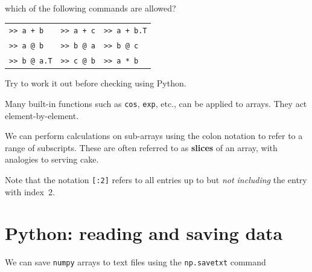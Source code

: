 




\noindent
which of the following commands are allowed?
\begin{center}
\begin{tabular}{p{30mm} p{30mm} p{30mm}}
\texttt{>> a + b}     & \texttt{>> a + c}     & \texttt{>> a + b.T} \\
\texttt{>> a @ b}       & \texttt{>> b @ a}       & \texttt{>> b @ c}    \\
\texttt{>> b @ a.T}      & \texttt{>> c @ b}      & \texttt{>> a * b}   \\
\end{tabular}
\end{center}
Try to work it out before checking using Python.

Many built-in functions such as \texttt{cos}, \texttt{exp}, etc., can be applied
to arrays. They act element-by-element.

We can perform calculations on sub-arrays using the colon notation to
refer to a range of subscripts. These are often referred to as
\textbf{slices} of an array, with analogies to serving cake.




Note that the notation \texttt{[:2]} refers to all entries up to but \textit{not including} the entry with index~2.

\section{Python: reading and saving data}
\label{sec:readandsave}

We can save \texttt{numpy} arrays to text files using the
\texttt{np.savetxt} command


